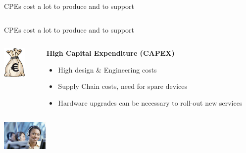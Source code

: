 \documentclass[a4paper]{beamer}
\begin{document}
\begin{frame}{CPEs cost a lot to produce and to support}
\begin{columns}[T]
\begin{column}[T]{0.75 \textwidth}
																																							
		\end{column}
																										
	\end{columns}
											
											
\end{frame}



\begin{frame}{CPEs cost a lot to produce and to support}
											
	\begin{columns}[T] 
		\begin{column}[T]{0.15 \textwidth} 
			\includegraphics[width=3em]{bagofmoney.jpg}
		\end{column}
																										
		\begin{column}[T]{0.75 \textwidth} %
																																							
																																								   
			\textbf{ High Capital Expenditure (CAPEX)}
			\begin{itemize}
				\item High design \& Engineering costs
				\item Supply Chain costs, need for spare devices
				\item Hardware upgrades can be necessary to roll-out new services
			\end{itemize}
			\vspace{3em}				     
																																							
		\end{column}
																										
	\end{columns}
											
											
	\begin{columns}[T] 
		\begin{column}[T]{0.15 \textwidth} 
			\includegraphics[width=6em]{customer-care.jpg}
		\end{column}
																						

\end{columns}
\end{frame}
\end{document}
